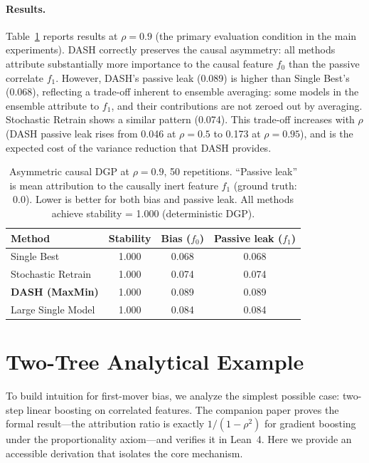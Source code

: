 \documentclass[11pt]{article}
\newcommand{\dash}{\textsc{DASH}}
\newcommand{\rhovar}{\rho}
\begin{document}
\paragraph{Results.}
Table~\ref{tab:asymmetric} reports results at $\rho = 0.9$ (the
primary evaluation condition in the main experiments).
\dash{} correctly preserves the causal asymmetry: all methods attribute
substantially more importance to the causal feature $f_0$ than the
passive correlate $f_1$. However, \dash{}'s passive leak (0.089) is
higher than Single Best's (0.068), reflecting a trade-off inherent to
ensemble averaging: some models in the ensemble attribute to $f_1$, and
their contributions are not zeroed out by averaging. Stochastic Retrain
shows a similar pattern (0.074). This trade-off increases with $\rho$
(DASH passive leak rises from 0.046 at $\rho{=}0.5$ to 0.173 at
$\rho{=}0.95$), and is the expected cost of the variance reduction
that \dash{} provides.

\begin{table}[htbp]
\centering
\caption{Asymmetric causal DGP at $\rho = 0.9$, 50 repetitions.
``Passive leak'' is mean attribution to the causally inert feature $f_1$
(ground truth: 0.0). Lower is better for both bias and passive leak.
All methods achieve stability = 1.000 (deterministic DGP).}
\label{tab:asymmetric}
\small
\begin{tabular}{lccc}
\toprule
\textbf{Method} & \textbf{Stability} & \textbf{Bias ($f_0$)} & \textbf{Passive leak ($f_1$)} \\
\midrule
Single Best & 1.000 & 0.068 & 0.068 \\
Stochastic Retrain & 1.000 & 0.074 & 0.074 \\
\textbf{DASH (MaxMin)} & 1.000 & 0.089 & 0.089 \\
Large Single Model & 1.000 & 0.084 & 0.084 \\
\bottomrule
\end{tabular}
\end{table}


\section{Two-Tree Analytical Example}
\label{app:twotree}

To build intuition for first-mover bias, we analyze the simplest possible
case: two-step linear boosting on correlated features. The companion
paper \citep{caraker2026impossibility} proves the formal result---the
attribution ratio is exactly $1/(1-\rhovar^2)$ for gradient boosting
under the proportionality axiom---and verifies it in Lean~4. Here we
provide an accessible derivation that isolates the core mechanism.
\end{document}
